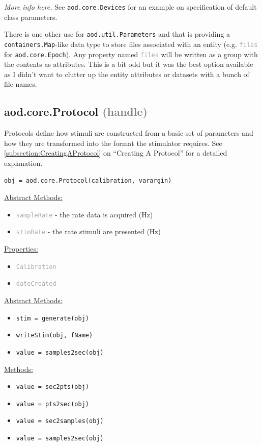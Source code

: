 \documentclass[10pt]{exam}
\newcommand\myurl[1]{\textcolor{blue}{\underline{#1}}}
\newcommand\myparent[1]{\textcolor{gray}{(#1)}}
\newcommand\aodclass[1]{\textcolor{codeblue}{\texttt{#1}}}
\newcommand\aodprop[1]{\textcolor{darkgray}{\texttt{#1}}}
\newcommand\aodfcn[1]{\textcolor{darkteal}{\texttt{#1}}}
\newcommand\docheader[1]{\vspace{0.6ex}\noindent\underline{#1}\vspace{0.15ex}}
\begin{document}
		\textit{More info here.} See \aodclass{aod.core.Devices} for an example on specification of default class parameters.
		
		There is one other use for \aodclass{aod.util.Parameters} and that is providing a \aodclass{containers.Map}-like data type to store files associated with an entity (e.g. \aodprop{files} for \aodclass{aod.core.Epoch}). Any property named \aodprop{files} will be written as a group with the contents as attributes. This is a bit odd but it was the best option available as I didn't want to clutter up the entity attributes or datasets with a bunch of file names.

	\subsection{aod.core.Protocol \myparent{handle}}
		\label{subsection:ProtocolDoc}
		\noindent Protocols define how stimuli are constructed from a basic set of parameters and how they are transformed into the format the stimulator requires. See \myurl{\ref{subsection:CreatingAProtocol}} on ``Creating A Protocol'' for a detailed explanation. 
		\begin{lstlisting}[style=matlab-editor, basicstyle=\mlttfamily\footnotesize]
obj = aod.core.Protocol(calibration, varargin)
		\end{lstlisting}
	
		\docheader{Abstract Methods:}
		\begin{itemize}
			\item \aodprop{sampleRate} - the rate data is acquired (Hz)
			\item \aodprop{stimRate} - the rate stimuli are presented (Hz)
		\end{itemize}
		\docheader{Properties:}
		\begin{itemize}
			\item \aodprop{Calibration}
			\item \aodprop{dateCreated}
		\end{itemize}
		\docheader{Abstract Methods:}
		\begin{itemize}
			\item \aodfcn{stim = generate(obj)}
			\item \aodfcn{writeStim(obj, fName)}
			\item \aodfcn{value = samples2sec(obj)}
		\end{itemize}
		\docheader{Methods:}
		\begin{itemize}
			\item \aodfcn{value = sec2pts(obj)}
			\item \aodfcn{value = pts2sec(obj)}
			\item \aodfcn{value = sec2samples(obj)}
			\item \aodfcn{value = samples2sec(obj)}
		\end{itemize}
		
\end{document}
